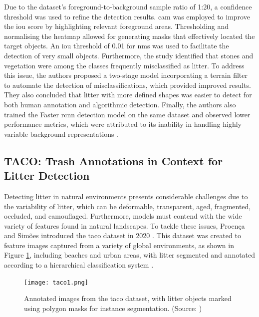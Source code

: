 Due to the dataset’s foreground-to-background sample ratio of 1:20, a confidence threshold was used to refine the detection results. \gls{cam} was employed to improve the \gls{iou} score by highlighting relevant foreground areas. Thresholding and normalising the heatmap allowed for generating masks that effectively located the target objects. An \gls{iou} threshold of 0.01 for \gls{nms} was used to facilitate the detection of very small objects.
Furthermore, the study identified that stones and vegetation were among the classes frequently misclassified as litter. To address this issue, the authors proposed a two-stage model incorporating a terrain filter to automate the detection of misclassifications, which provided improved results. They also concluded that litter with more defined shapes was easier to detect for both human annotation and algorithmic detection. 
Finally, the authors also trained the Faster \gls{rcnn} detection model on the same dataset and observed lower performance metrics, which were attributed to its inability in handling highly variable background representations \cite{small_litter_detection}.

\subsection{TACO: Trash Annotations in Context for Litter Detection}
\label{subsec:3_tacodataset}

Detecting litter in natural environments presents considerable challenges due to the variability of litter, which can be deformable, transparent, aged, fragmented, occluded, and camouflaged. Furthermore, models must contend with the wide variety of features found in natural landscapes. To tackle these issues, Proença and Simões introduced the \gls{taco} dataset in 2020 \cite{taco2020}. This dataset was created to feature images captured from a variety of global environments, as shown in Figure \ref{fig:taco1}, including beaches and urban areas, with litter segmented and annotated according to a hierarchical classification system \cite{taco2020}.

\begin{figure}[!htbp]
    \centering
    \texttt{[image: taco1.png]}
    \caption{Annotated images from the \gls{taco} dataset, with litter objects marked using polygon masks for instance segmentation. (Source: \cite{taco2020})}
    \label{fig:taco1}
\end{figure}

